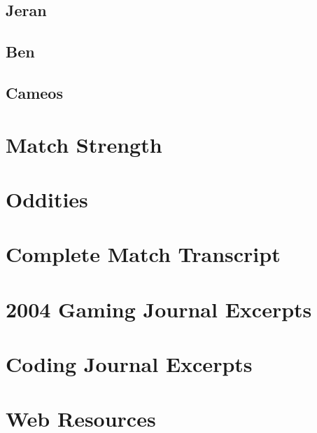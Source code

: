 \documentclass[a4paper,twoside,titlepage]{book}
\begin{document}
      \section{Jeran}
      \section{Ben}
      \section{Cameos}
    \chapter{Match Strength}
    \chapter{Oddities}
  \appendix
    \chapter{Complete Match Transcript}
    \chapter{2004 Gaming Journal Excerpts}
    \chapter{Coding Journal Excerpts}
    \chapter{Web Resources}
  \clearpage
  \printindex
\end{document}
